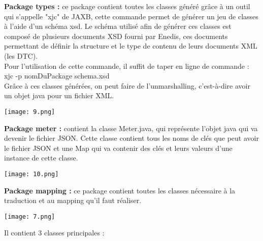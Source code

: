 \textbf{Package types :} ce package contient toutes les classes généré grâce à un outil qui s'appelle "xjc" de JAXB, cette commande permet de générer un jeu de classes à l'aide d'un schéma xsd. Le schéma utilisé afin de générer ces classes est composé de plusieurs documents XSD fourni par Enedis, ces documents permettant de définir la structure et le type de contenu de leurs documents XML (les DTC).\\
Pour l'utilisation de cette commande, il suffit de taper en ligne de commande : xjc -p nomDuPackage schema.xsd\\
Grâce à ces classes générées, on peut faire de l'unmarshalling, c'est-à-dire avoir un objet java pour un fichier XML.
\begin{center}
	\texttt{[image: 9.png]}
\end{center}	
\textbf{Package meter :} contient la classe Meter.java, qui représente l'objet java qui va devenir le fichier JSON. Cette classe contient tous les noms de clés que peut avoir le fichier JSON et une Map qui va contenir des clés et leurs valeurs d'une instance de cette classe. 		
\begin{center}
	\texttt{[image: 10.png]}
\end{center}	
\textbf{Package mapping :} ce package contient toutes les classes nécessaire à la traduction et au mapping qu'il faut réaliser.
\begin{center}
	\texttt{[image: 7.png]}
\end{center}
Il contient 3 classes principales :
